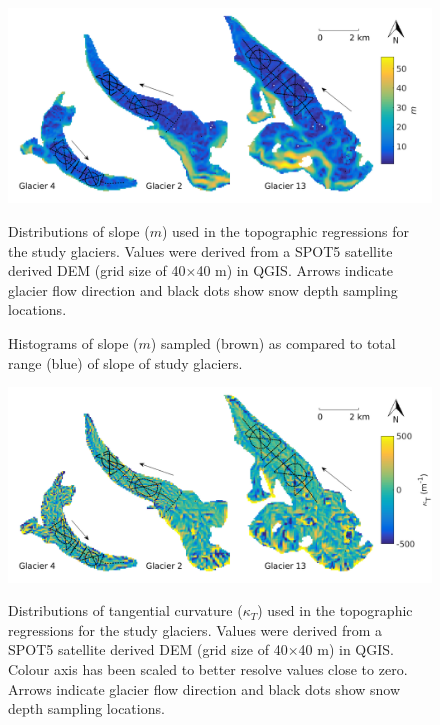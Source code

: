 \documentclass[12pt]{article}
\newcommand{\topomap}{Arrows indicate glacier flow direction and black dots show snow depth sampling locations. }
\begin{document}
\begin{figure}[H]
	\centering
	\includegraphics[width=\textwidth]{Map_slope.png}\\
	\caption{Distributions of slope ($m$) used in the topographic regressions for the study glaciers. Values were derived from a SPOT5 satellite derived DEM (grid size of 40$\times$40 m) in QGIS. \topomap}
	\label{map:slope}
\end{figure}

\begin{figure}[H]
	\caption{Histograms of slope ($m$) sampled (brown) as compared to total range (blue) of slope of study glaciers.}
	\label{sampledRange:slope}
\end{figure}

\begin{figure}[H]
	\centering
	\includegraphics[width=\textwidth]{Map_tangentCurve.png}\\
	\caption{Distributions of tangential curvature ($\kappa_T$) used in the topographic regressions for the study glaciers. Values were derived from a SPOT5 satellite derived DEM (grid size of 40$\times$40 m) in QGIS. Colour axis has been scaled to better resolve values close to zero. \topomap}
	\label{map:tangentC}
\end{figure}
\end{document}
